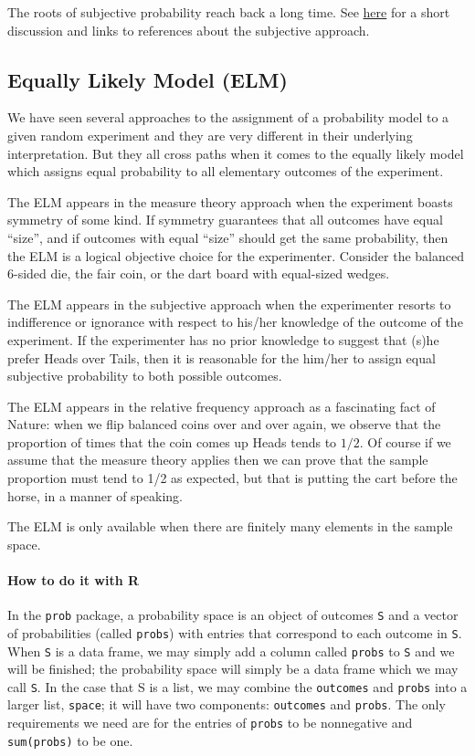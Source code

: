 \documentclass[captions=tableheading]{scrbook}
\begin{document}
The roots of subjective probability reach back a long time. See \href{http://en.wikipedia.org/wiki/Subjective_probability}{here} for a short discussion and links to references about the subjective approach.
\subsection{Equally Likely Model (ELM)}
\label{sec-4-3-4}


We have seen several approaches to the assignment of a probability model to a given random experiment and they are very different in their underlying interpretation. But they all cross paths when it comes to the equally likely model which assigns equal probability to all elementary outcomes of the experiment.

The ELM appears in the measure theory approach when the experiment boasts symmetry of some kind. If symmetry guarantees that all outcomes have equal ``size'', and if outcomes with equal ``size'' should get the same probability, then the ELM is a logical objective choice for the experimenter. Consider the balanced 6-sided die, the fair coin, or the dart board with equal-sized wedges.

The ELM appears in the subjective approach when the experimenter resorts to indifference or ignorance with respect to his/her knowledge of the outcome of the experiment. If the experimenter has no prior knowledge to suggest that (s)he prefer Heads over Tails, then it is reasonable for the him/her to assign equal subjective probability to both possible outcomes.

The ELM appears in the relative frequency approach as a fascinating fact of Nature: when we flip balanced coins over and over again, we observe that the proportion of times that the coin comes up Heads tends to \(1/2\). Of course if we assume that the measure theory applies then we can prove that the sample proportion must tend to 1/2 as expected, but that is putting the cart before the horse, in a manner of speaking.

The ELM is only available when there are finitely many elements in the sample space.

\paragraph*{How to do it with \textsf{R}}

In the \texttt{prob} package, a probability space is an object of outcomes \texttt{S} and a vector of probabilities (called \texttt{probs}) with entries that correspond to each outcome in \texttt{S}. When \texttt{S} is a data frame, we may simply add a column called \texttt{probs} to \texttt{S} and we will be finished; the probability space will simply be a data frame which we may call \texttt{S}. In the case that S is a list, we may combine the \texttt{outcomes} and \texttt{probs} into a larger list, \texttt{space}; it will have two components: \texttt{outcomes} and \texttt{probs}. The only requirements we need are for the entries of \texttt{probs} to be nonnegative and \texttt{sum(probs)} to be one.
\end{document}
